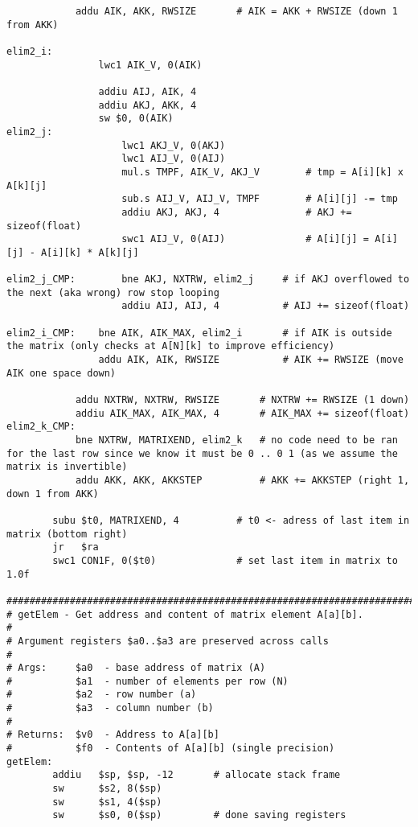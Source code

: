 \begin{verbatim}
            addu AIK, AKK, RWSIZE       # AIK = AKK + RWSIZE (down 1 from AKK)  
            
elim2_i:        
                lwc1 AIK_V, 0(AIK)
                
                addiu AIJ, AIK, 4
                addiu AKJ, AKK, 4
                sw $0, 0(AIK)               
elim2_j:        
                    lwc1 AKJ_V, 0(AKJ)  
                    lwc1 AIJ_V, 0(AIJ)              
                    mul.s TMPF, AIK_V, AKJ_V        # tmp = A[i][k] x A[k][j]
                    sub.s AIJ_V, AIJ_V, TMPF        # A[i][j] -= tmp                    
                    addiu AKJ, AKJ, 4               # AKJ += sizeof(float)              
                    swc1 AIJ_V, 0(AIJ)              # A[i][j] = A[i][j] - A[i][k] * A[k][j]
        
elim2_j_CMP:        bne AKJ, NXTRW, elim2_j     # if AKJ overflowed to the next (aka wrong) row stop looping
                    addiu AIJ, AIJ, 4           # AIJ += sizeof(float)
                
elim2_i_CMP:    bne AIK, AIK_MAX, elim2_i       # if AIK is outside the matrix (only checks at A[N][k] to improve efficiency)
                addu AIK, AIK, RWSIZE           # AIK += RWSIZE (move AIK one space down)
            
            addu NXTRW, NXTRW, RWSIZE       # NXTRW += RWSIZE (1 down)
            addiu AIK_MAX, AIK_MAX, 4       # AIK_MAX += sizeof(float)
elim2_k_CMP:    
            bne NXTRW, MATRIXEND, elim2_k   # no code need to be ran for the last row since we know it must be 0 .. 0 1 (as we assume the matrix is invertible)
            addu AKK, AKK, AKKSTEP          # AKK += AKKSTEP (right 1, down 1 from AKK)
            
        subu $t0, MATRIXEND, 4          # t0 <- adress of last item in matrix (bottom right)
        jr   $ra
        swc1 CON1F, 0($t0)              # set last item in matrix to 1.0f
        
################################################################################
# getElem - Get address and content of matrix element A[a][b].
#
# Argument registers $a0..$a3 are preserved across calls
#
# Args:     $a0  - base address of matrix (A)
#           $a1  - number of elements per row (N)
#           $a2  - row number (a)
#           $a3  - column number (b)
#                       
# Returns:  $v0  - Address to A[a][b]
#           $f0  - Contents of A[a][b] (single precision)
getElem:
        addiu   $sp, $sp, -12       # allocate stack frame
        sw      $s2, 8($sp)
        sw      $s1, 4($sp)
        sw      $s0, 0($sp)         # done saving registers
        

\end{verbatim}

